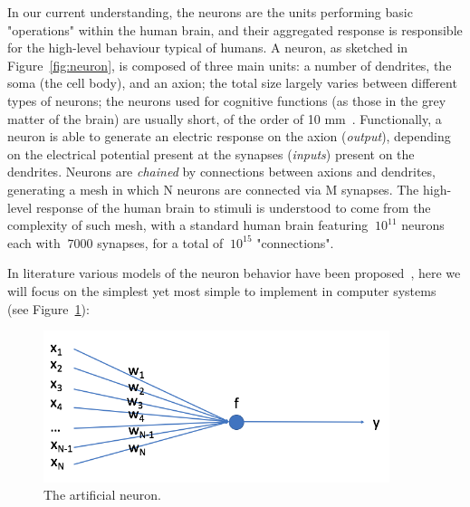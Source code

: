  In our current understanding, the neurons are the units performing basic "operations" within the human brain, and their aggregated response is responsible for the high-level behaviour typical of humans.
 A neuron, as sketched in Figure~\ref{fig:neuron}, is composed of three main units: a number of dendrites, the soma (the cell body), and an axion; the total size largely varies between different types of neurons; the neurons used for cognitive functions (as those in the grey matter of the brain) are usually short, of the order of 10 mm~\cite{neuronlength}.
Functionally, a neuron is able to generate an electric response on the axion (\emph{output}), depending on the electrical potential present at the synapses (\emph{inputs}) present on the dendrites. Neurons are \emph{chained} by connections between axions and dendrites, generating a mesh in which N neurons are connected via M synapses.
 The high-level response of the human brain to stimuli is understood to come from the complexity of such mesh, with a standard human brain featuring $~10^{11}$ neurons each with $~7000$ synapses, for a total of $~10^{15}$ "connections".

 In literature various models of the neuron behavior have been proposed~\cite{neuronbe1, neuronbe2}, 
 here we will focus on the simplest yet most simple to implement in computer systems~\cite{artificialneuron} (see Figure~\ref{fig:artificialneuron}): %
 
 \begin{figure}[h]
    \centering
    \hfill
        \includegraphics[width=0.9\textwidth]{images/artificialneuron.png}
     \caption{The artificial neuron.}
     \label{fig:artificialneuron}

\end{figure}
 
